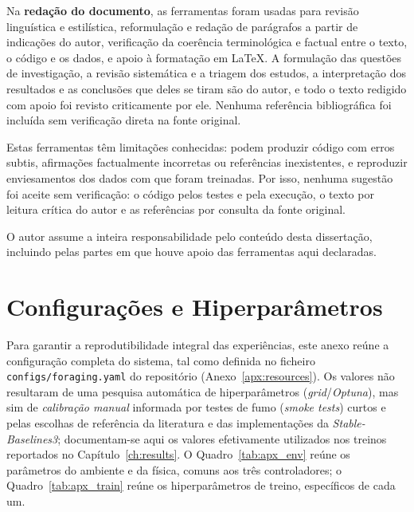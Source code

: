 \documentclass[12pt,reqno, twoside]{amsbook}
\theoremstyle{plain}
\numberwithin{equation}{chapter}
\numberwithin{section}{chapter}
\numberwithin{table}{chapter}
\numberwithin{figure}{chapter}
\begin{document}
Na \textbf{redação do documento}, as ferramentas foram usadas para revisão linguística e estilística, reformulação e redação de parágrafos a partir de indicações do autor, verificação da coerência terminológica e factual entre o texto, o código e os dados, e apoio à formatação em \LaTeX. A formulação das questões de investigação, a revisão sistemática e a triagem dos estudos, a interpretação dos resultados e as conclusões que deles se tiram são do autor, e todo o texto redigido com apoio foi revisto criticamente por ele. Nenhuma referência bibliográfica foi incluída sem verificação direta na fonte original.

Estas ferramentas têm limitações conhecidas: podem produzir código com erros subtis, afirmações factualmente incorretas ou referências inexistentes, e reproduzir enviesamentos dos dados com que foram treinadas. Por isso, nenhuma sugestão foi aceite sem verificação: o código pelos testes e pela execução, o texto por leitura crítica do autor e as referências por consulta da fonte original.

O autor assume a inteira responsabilidade pelo conteúdo desta dissertação, incluindo pelas partes em que houve apoio das ferramentas aqui declaradas.

\chapter{Configurações e Hiperparâmetros}
\label{apx:hyperparameters}
Para garantir a reprodutibilidade integral das experiências, este anexo reúne a configuração completa do sistema, tal como definida no ficheiro \texttt{configs/foraging.yaml} do repositório (Anexo~\ref{apx:resources}). Os valores não resultaram de uma pesquisa automática de hiperparâmetros (\textit{grid}/\textit{Optuna}), mas sim de \emph{calibração manual} informada por testes de fumo (\textit{smoke tests}) curtos e pelas escolhas de referência da literatura e das implementações da \textit{Stable-Baselines3}; documentam-se aqui os valores efetivamente utilizados nos treinos reportados no Capítulo~\ref{ch:results}. O Quadro~\ref{tab:apx_env} reúne os parâmetros do ambiente e da física, comuns aos três controladores; o Quadro~\ref{tab:apx_train} reúne os hiperparâmetros de treino, específicos de cada um.
\end{document}
